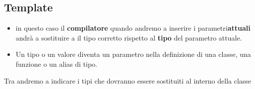 \subsection{Template}

\begin{itemize}
    \item in questo caso il \textbf{compilatore} quando andremo  a inserire i parametri\textbf{attuali} andrà a sostituire a \textcolor{blue}{} il tipo corretto rispetto al \textbf{tipo} del parametro attuale.
    \item Un tipo o un valore diventa un parametro nella definizione di una classe, una funzione o un alias di tipo.
\end{itemize}
\newpage
\begin{tcolorbox}[width=16cm, boxsep=10pt]
    
    \textcolor{blue}{} Tra \textcolor{blue}{\code{<>}} andremo a indicare i tipi che dovranno essere sostituiti al interno della classe
\end{tcolorbox}







